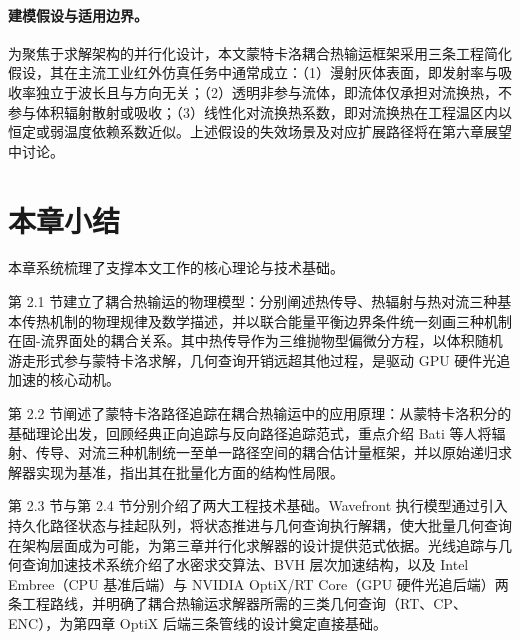 \paragraph{建模假设与适用边界。}为聚焦于求解架构的并行化设计，本文蒙特卡洛耦合热输运框架采用三条工程简化假设，其在主流工业红外仿真任务中通常成立：（1）漫射灰体表面，即发射率与吸收率独立于波长且与方向无关；（2）透明非参与流体，即流体仅承担对流换热，不参与体积辐射散射或吸收；（3）线性化对流换热系数，即对流换热在工程温区内以恒定或弱温度依赖系数近似。上述假设的失效场景及对应扩展路径将在第六章展望中讨论。

\section{本章小结}

本章系统梳理了支撑本文工作的核心理论与技术基础。

第 2.1 节建立了耦合热输运的物理模型：分别阐述热传导、热辐射与热对流三种基本传热机制的物理规律及数学描述，并以联合能量平衡边界条件统一刻画三种机制在固-流界面处的耦合关系。其中热传导作为三维抛物型偏微分方程，以体积随机游走形式参与蒙特卡洛求解，几何查询开销远超其他过程，是驱动 GPU 硬件光追加速的核心动机。

第 2.2 节阐述了蒙特卡洛路径追踪在耦合热输运中的应用原理：从蒙特卡洛积分的基础理论出发，回顾经典正向追踪与反向路径追踪范式，重点介绍 Bati 等人将辐射、传导、对流三种机制统一至单一路径空间的耦合估计量框架，并以原始递归求解器实现为基准，指出其在批量化方面的结构性局限。

第 2.3 节与第 2.4 节分别介绍了两大工程技术基础。Wavefront 执行模型通过引入持久化路径状态与挂起队列，将状态推进与几何查询执行解耦，使大批量几何查询在架构层面成为可能，为第三章并行化求解器的设计提供范式依据。光线追踪与几何查询加速技术系统介绍了水密求交算法、BVH 层次加速结构，以及 Intel Embree（CPU 基准后端）与 NVIDIA OptiX/RT Core（GPU 硬件光追后端）两条工程路线，并明确了耦合热输运求解器所需的三类几何查询（RT、CP、ENC），为第四章 OptiX 后端三条管线的设计奠定直接基础。